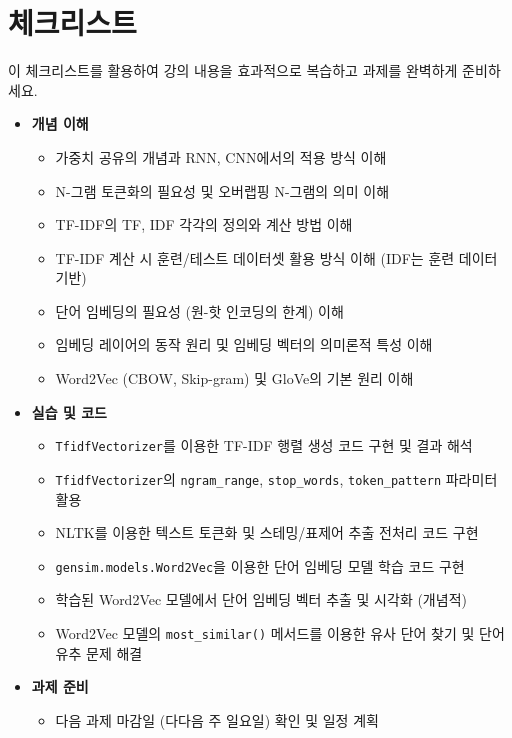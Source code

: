 \documentclass[11pt,a4paper]{article}
\theoremstyle{definition}
\newcommand{\newsection}[1]{\newpage\section{#1}}
\begin{document}
\newsection{체크리스트}

\begin{tcolorbox}[summarybox, title=📝 학습 및 과제 점검 체크리스트]
이 체크리스트를 활용하여 강의 내용을 효과적으로 복습하고 과제를 완벽하게 준비하세요.
\end{tcolorbox}

\begin{itemize}
    \item \textbf{개념 이해}
    \begin{itemize}
        \item [ ] 가중치 공유의 개념과 RNN, CNN에서의 적용 방식 이해
        \item [ ] N-그램 토큰화의 필요성 및 오버랩핑 N-그램의 의미 이해
        \item [ ] TF-IDF의 TF, IDF 각각의 정의와 계산 방법 이해
        \item [ ] TF-IDF 계산 시 훈련/테스트 데이터셋 활용 방식 이해 (IDF는 훈련 데이터 기반)
        \item [ ] 단어 임베딩의 필요성 (원-핫 인코딩의 한계) 이해
        \item [ ] 임베딩 레이어의 동작 원리 및 임베딩 벡터의 의미론적 특성 이해
        \item [ ] Word2Vec (CBOW, Skip-gram) 및 GloVe의 기본 원리 이해
    \end{itemize}
    \item \textbf{실습 및 코드}
    \begin{itemize}
        \item [ ] \texttt{TfidfVectorizer}를 이용한 TF-IDF 행렬 생성 코드 구현 및 결과 해석
        \item [ ] \texttt{TfidfVectorizer}의 \texttt{ngram\_range}, \texttt{stop\_words}, \texttt{token\_pattern} 파라미터 활용
        \item [ ] NLTK를 이용한 텍스트 토큰화 및 스테밍/표제어 추출 전처리 코드 구현
        \item [ ] \texttt{gensim.models.Word2Vec}을 이용한 단어 임베딩 모델 학습 코드 구현
        \item [ ] 학습된 Word2Vec 모델에서 단어 임베딩 벡터 추출 및 시각화 (개념적)
        \item [ ] Word2Vec 모델의 \texttt{most\_similar()} 메서드를 이용한 유사 단어 찾기 및 단어 유추 문제 해결
    \end{itemize}
    \item \textbf{과제 준비}
    \begin{itemize}
        \item [ ] 다음 과제 마감일 (다다음 주 일요일) 확인 및 일정 계획

\end{itemize}
\end{itemize}
\end{document}
